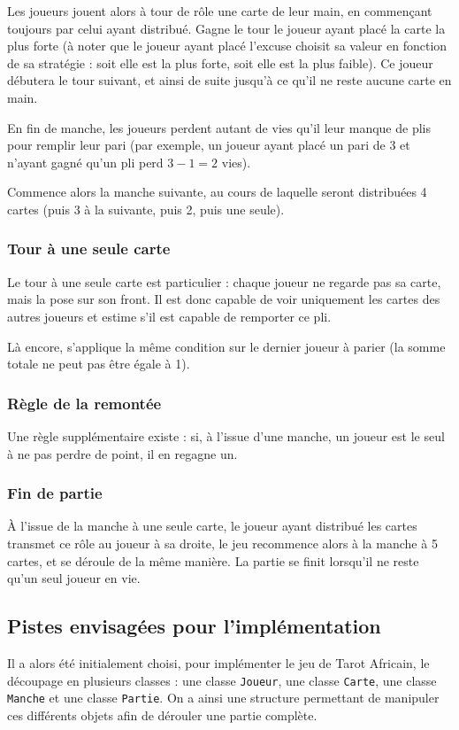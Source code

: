          Les joueurs jouent alors à tour de rôle une carte de leur main, en commençant toujours par celui ayant distribué.
         Gagne le tour le joueur ayant placé la carte la plus forte (à noter que le joueur ayant placé l'excuse choisit sa valeur en fonction de sa stratégie : soit elle est la plus forte, soit elle est la plus faible).
         Ce joueur débutera le tour suivant, et ainsi de suite jusqu'à ce qu'il ne reste aucune carte en main.

         En fin de manche, les joueurs perdent autant de vies qu'il leur manque de plis pour remplir leur pari (par exemple, un joueur ayant placé un pari de 3 et n'ayant gagné qu'un pli perd $3-1 = 2$ vies).

         Commence alors la manche suivante, au cours de laquelle seront distribuées 4 cartes (puis 3 à la suivante, puis 2, puis une seule).
      \subsubsection{Tour à une seule carte}
         Le tour à une seule carte est particulier : chaque joueur ne regarde pas sa carte, mais la pose sur son front.
         Il est donc capable de voir uniquement les cartes des autres joueurs et estime s'il est capable de remporter ce pli.

         Là encore, s'applique la même condition sur le dernier joueur à parier (la somme totale ne peut pas être égale à 1).

      \subsubsection{Règle de la \og remontée \fg{}}
         Une règle supplémentaire existe : si, à l'issue d'une manche, un joueur est le seul à ne pas perdre de point, il en regagne un.

      \subsubsection{Fin de partie}
         À l'issue de la manche à une seule carte, le joueur ayant distribué les cartes transmet ce rôle au joueur à sa droite, le jeu recommence alors à la manche à 5 cartes, et se déroule de la même manière.
         La partie se finit lorsqu'il ne reste qu'un seul joueur en vie.

   \subsection{Pistes envisagées pour l'implémentation}\label{subsec:pistes-envisagées-pour-l'implémentation}
      Il a alors été initialement choisi, pour implémenter le jeu de Tarot Africain, le découpage en plusieurs classes : une classe \texttt{Joueur}, une classe \texttt{Carte}, une classe \texttt{Manche} et une classe \texttt{Partie}.
      On a ainsi une structure permettant de manipuler ces différents objets afin de dérouler une partie complète.

